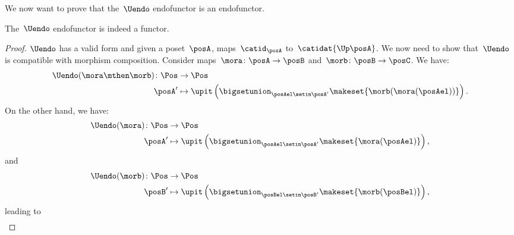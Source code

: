 We now want to prove that the~$\Uendo$ endofunctor is an endofunctor.

\begin{lemma}
    \label{lem:Uendo-is-functor}
    The~$\Uendo$ endofunctor is indeed a functor.
\end{lemma}

\begin{proof}
    $\Uendo$ has a valid form and given a poset~$\posA$, maps~$\catid_\posA$ to~$\catidat{\Up \posA}$.
    We now need to show that~$\Uendo$ is compatible with morphism composition.
    Consider maps~$\mora\colon \posA \to \posB$ and~$\morb\colon \posB \to \posC$.
    We have:
    \begin{equation}
        \label{eq:ufunctor_1}
        \begin{aligned}
            \Uendo(\mora\mthen \morb)\colon \Pos & \to \Pos \\
            \posA'                               & \mapsto \upit \left( \bigsetunion_{\posAel\setin \posA'} \makeset{\morb(\mora(\posAel))}\right).
        \end{aligned}
    \end{equation}
    On the other hand, we have:
    \begin{equation}
        \begin{aligned}
            \Uendo(\mora)\colon \Pos & \to \Pos \\
            \posA'                   & \mapsto \upit \left( \bigsetunion_{\posAel\setin \posA'}\makeset{\mora(\posAel)}\right),
        \end{aligned}
    \end{equation}
    and
    \begin{equation}
        \begin{aligned}
            \Uendo(\morb)\colon \Pos & \to \Pos \\
            \posB'                   & \mapsto \upit \left( \bigsetunion_{\posBel\setin \posB'}\makeset{\morb(\posBel)}\right),
        \end{aligned}
    \end{equation}
    leading to
    \begin{equation}
        \label{eq:ufunctor_2}
        \begin{aligned}

\end{aligned}
\end{equation}
\end{proof}

